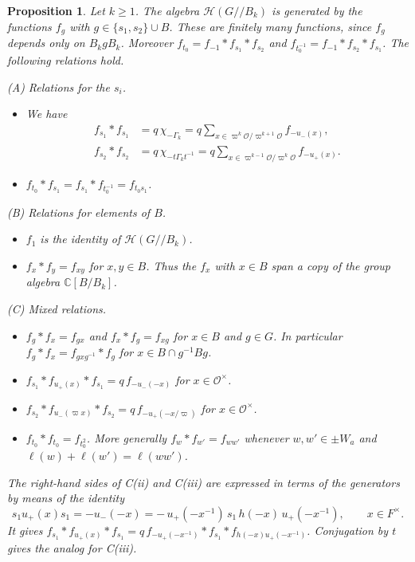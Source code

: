 \documentclass[12pt,letterpaper]{amsart}
\numberwithin{equation}{section}
\newtheorem{proposition}[theorem]{Proposition}
\theoremstyle{definition}
\theoremstyle{remark}
\newcommand{\cO}{\mathcal{O}}
\newcommand{\cH}{\mathcal{H}}
\newcommand{\C}{\mathbb{C}}
\newcommand{\Hlin}{\cH(G/\!/B_k)}
\begin{document}
\begin{proposition}
\label{prop:main}
Let $k\geq 1$. The algebra $\Hlin$ is generated by the functions $f_g$
with $g\in\{s_1,s_2\}\cup B$. These are finitely many functions, since
$f_g$ depends only on $B_kgB_k$. Moreover
$f_{t_0}=f_{-1}*f_{s_1}*f_{s_2}$ and
$f_{t_0^{-1}}=f_{-1}*f_{s_2}*f_{s_1}$. The following relations hold.

\smallskip\noindent
\textup{(A)} Relations for the $s_i$.
\begin{itemize}[leftmargin=3em]
\item[(i)] We have
\begin{align*}
f_{s_1}*f_{s_1}&=q\,\chi_{-\Gamma_k}
=q\sum_{x\in\varpi^k\cO/\varpi^{k+1}\cO}f_{-u_-(x)},\\
f_{s_2}*f_{s_2}&=q\,\chi_{-t\Gamma_kt^{-1}}
=q\sum_{x\in\varpi^{k-1}\cO/\varpi^{k}\cO}f_{-u_+(x)}.
\end{align*}
\item[(ii)] $f_{t_0}*f_{s_1}=f_{s_1}*f_{t_0^{-1}}=f_{t_0s_1}$.
\end{itemize}

\noindent
\textup{(B)} Relations for elements of $B$.
\begin{itemize}[leftmargin=3em]
\item[(i)] $f_1$ is the identity of $\Hlin$.
\item[(ii)] $f_x*f_y=f_{xy}$ for $x,y\in B$. Thus the $f_x$ with $x\in
B$ span a copy of the group algebra $\C[B/B_k]$.
\end{itemize}

\noindent
\textup{(C)} Mixed relations.
\begin{itemize}[leftmargin=3em]
\item[(i)] $f_g*f_x=f_{gx}$ and $f_x*f_g=f_{xg}$ for $x\in B$ and
$g\in G$. In particular $f_{g}*f_x=f_{gxg^{-1}}*f_{g}$ for
$x\in B\cap g^{-1}Bg$.
\item[(ii)] $f_{s_1}*f_{u_+(x)}*f_{s_1}=q\,f_{-u_-(-x)}$ for
$x\in\cO^\times$.
\item[(iii)] $f_{s_2}*f_{u_-(\varpi x)}*f_{s_2}
=q\,f_{-u_+(-x/\varpi)}$ for $x\in\cO^\times$.
\item[(iv)] $f_{t_0}*f_{t_0}=f_{t_0^2}$. More generally
$f_{w}*f_{w'}=f_{ww'}$ whenever $w,w'\in \pm W_a$ and
$\ell(w)+\ell(w')=\ell(ww')$.
\end{itemize}

\noindent
The right-hand sides of \textup{C(ii)} and \textup{C(iii)} are
expressed in terms of the generators by means of the identity
\begin{equation}
\label{eq:bruhat}
s_1u_+(x)s_1=-u_-(-x)=-\,u_+(-x^{-1})\,s_1\,h(-x)\,u_+(-x^{-1}),
\qquad x\in F^\times.
\end{equation}
It gives $f_{s_1}*f_{u_+(x)}*f_{s_1}
=q\,f_{-u_+(-x^{-1})}*f_{s_1}*f_{h(-x)u_+(-x^{-1})}$. Conjugation by
$t$ gives the analog for C(iii).
\end{proposition}
\end{document}
